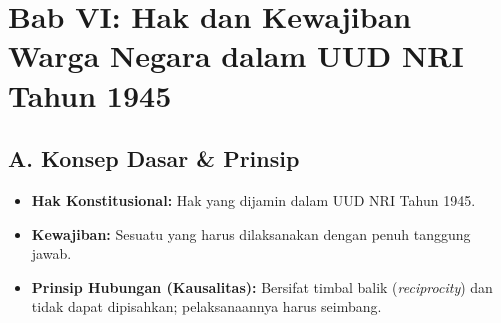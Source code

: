 \section{Bab VI: Hak dan Kewajiban Warga Negara dalam UUD NRI Tahun 1945}
\subsection{A. Konsep Dasar \& Prinsip}
\begin{itemize}
    \item \textbf{Hak Konstitusional:} Hak yang dijamin dalam UUD NRI Tahun 1945.
    \item \textbf{Kewajiban:} Sesuatu yang harus dilaksanakan dengan penuh tanggung jawab.
    \item \textbf{Prinsip Hubungan (Kausalitas):} Bersifat timbal balik (\textit{reciprocity}) dan tidak dapat dipisahkan; pelaksanaannya harus seimbang.
\end{itemize}

